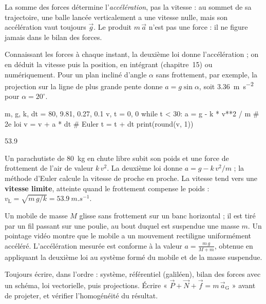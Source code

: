 \begin{attention}
La somme des forces détermine l'\emph{accélération}, pas la vitesse : au sommet de sa trajectoire, une balle lancée
verticalement a une vitesse nulle, mais son accélération vaut toujours $\vec{g}$. Le produit $m\,\vec{a}$ n'est pas une
force : il ne figure jamais dans le bilan des forces.
\end{attention}
\begin{propriete}
Connaissant les forces à chaque instant, la deuxième loi donne l'accélération ; on en déduit la vitesse puis la
position, en intégrant (chapitre~15) ou numériquement. Pour un plan incliné d'angle $\alpha$ sans frottement, par
exemple, la projection sur la ligne de plus grande pente donne $a=g\sin\alpha$, soit \qty{3,36}{m.s^{-2}} pour
$\alpha=20^\circ$.
\end{propriete}
\begin{codecote}[0.56]
\begin{pythoncol}
m, g, k, dt = 80, 9.81, 0.27, 0.1
v, t = 0, 0
while t < 30:
    a = g - k * v**2 / m    # 2e loi
    v = v + a * dt          # Euler
    t = t + dt
print(round(v, 1))
\end{pythoncol}
\begin{consolecol}
53.9
\end{consolecol}
\cote
\fontsize{9.5}{12.5}\selectfont
{}\par\smallskip
Un parachutiste de 80~kg en chute libre subit son poids et une force de frottement de l'air de valeur $k\,v^2$. La
deuxième loi donne $a=g-k\,v^2/m$ ; la méthode d'Euler calcule la vitesse de proche en proche. La vitesse tend vers une
\textbf{vitesse limite}, atteinte quand le frottement compense le poids : $v_\mathrm{L}=\sqrt{m\,g/k}=\qty{53,9}{m.s^{-1}}$.
\end{codecote}
\begin{experience}
Un mobile de masse $M$ glisse sans frottement sur un banc horizontal ; il est tiré par un fil passant sur une poulie, au
bout duquel est suspendue une masse $m$. Un pointage vidéo montre que le mobile a un mouvement rectiligne uniformément
accéléré. L'accélération mesurée est conforme à la valeur $a=\frac{m\,g}{M+m}$, obtenue en appliquant la deuxième loi au
système formé du mobile et de la masse suspendue.
\end{experience}
\begin{rediger}
Toujours écrire, dans l'ordre : système, référentiel (galiléen), bilan des forces avec un schéma, loi vectorielle, puis
projections. Écrire « $\vec{P}+\vec{N}+\vec{f}=m\,\vec{a}_\mathrm{G}$ » avant de projeter, et vérifier l'homogénéité
du résultat.
\end{rediger}
\exercices

